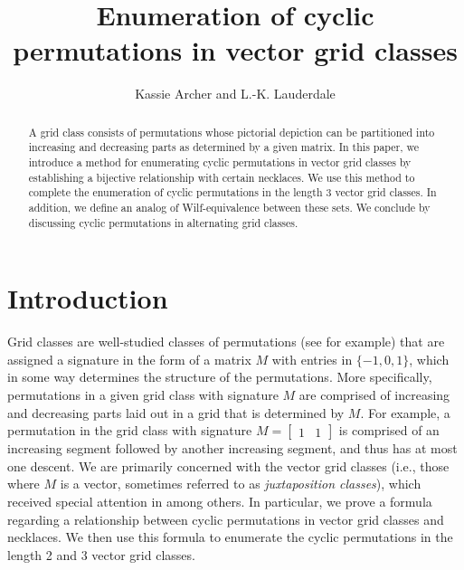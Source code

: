 \documentclass[12pt]{article}
\title{Enumeration of cyclic permutations in vector grid classes}
\author{Kassie Archer and L.-K. Lauderdale}
\date{}
\newcommand{\todo}[1]{\vspace{2 mm}\par\noindent
   \marginpar[\flushright\textsc{ToDo}]{\textsc{ToDo}}\framebox{\begin{minipage}[c]{\textwidth}
   \tt #1 \end{minipage}}\vspace{2 mm}\par}
\theoremstyle{plain}
\theoremstyle{definition}
\begin{document}
\maketitle

\begin{abstract}
A grid class consists of permutations whose pictorial depiction can be partitioned into increasing and decreasing parts as determined by a given matrix. In this paper, we introduce a method for enumerating cyclic permutations in vector grid classes by establishing a bijective relationship with certain necklaces. We use this method to complete the enumeration of cyclic permutations in the length 3 vector grid classes. In addition, we define an analog of Wilf-equivalence between these sets. We conclude by discussing cyclic permutations in alternating grid classes.
\end{abstract}







\section{Introduction}


Grid classes are well-studied classes of permutations (see \cite{AAVRB, HucVat, MurVat} for example) that are assigned a signature in the form of a matrix $M$ with entries in $\{-1,0,1\}$, which in some way determines the structure of the permutations. More specifically, permutations in a given grid class with signature $M$ are comprised of increasing and decreasing parts laid out in a grid that is determined by $M$. For example, a permutation in the grid class with signature $M=\begin{bmatrix} 1 & 1
\end{bmatrix}$ is comprised of an increasing segment followed by another increasing segment, and thus has at most one descent. We are primarily concerned with the vector grid classes (i.e., those where $M$ is a vector, sometimes referred to as \textit{juxtaposition classes}), which received special attention in \cite{ATKINSON_RP, AMR, ARCHERELIZALDE2014} among others.  In particular, we prove a formula regarding a relationship between cyclic permutations in vector grid classes and necklaces. We then use this formula to enumerate the cyclic permutations in the length 2 and 3 vector grid classes.
\end{document}
